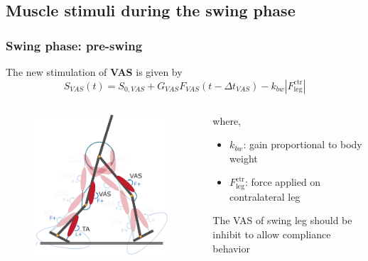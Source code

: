 \documentclass[10pt]{beamer}
\begin{document}
	
	\subsection[Methodology]{Muscle stimuli during the swing phase}
	\begin{frame}
		\frametitle{Swing phase: pre-swing}
		\begin{block}{}
			The new stimulation of \textbf{VAS} is given by
			\begin{equation*}
				S_{VAS}(t)=S_{0,VAS} + G_{VAS} F_{VAS} (t-\Delta t_{VAS}) - k_{bw}|F_{\textrm{leg}}^{\textrm{ctr}}|
			\end{equation*}
		\end{block}
		
		\begin{columns}
			\begin{column}{.5\textwidth}
				\begin{figure}
					\centering
					\includegraphics[width=.5\textheight]{images/new_model/swing/muscle_pre_vas.pdf}
				\end{figure}
			\end{column}
			\begin{column}{.5\textwidth}
				where,
				\begin{itemize}
					\item $k_{bw}$: gain proportional to body weight
					\item $F_{\textrm{leg}}^{\textrm{ctr}}$: force applied on contralateral leg
				\end{itemize}
				\begin{exampleblock}{}
					The VAS of swing leg should be inhibit to allow compliance behavior 
				\end{exampleblock}
			\end{column}
		\end{columns}	
	\end{frame}
	
\end{document}
